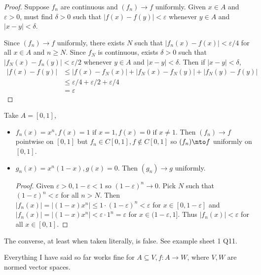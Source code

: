 \documentclass[a4paper]{article}
\theoremstyle{definition}
\begin{document}
\begin{proof}
  Suppose \(f_n\) are continuous and \((f_n)\to f\) uniformly. Given \(x\in A\) and \(\varepsilon>0\), must find \(\delta>0\) such that \(|f(x)-f(y)| < \varepsilon\) whenever \(y\in A\) and \(|x-y|<\delta\).

  Since \((f_n)\to f\) uniformly, there exists \(N\) such that \(|f_n(x)-f(x)|< \varepsilon/4\) for all \(x\in A\) and \(n\geq N\). Since \(f_N\) is continuous, exists \(\delta>0\) such that \(|f_N(x)-f_n(y)|<\varepsilon/2\) whenever \(y\in A\) and \(|x-y|<\delta\). Then if \(|x-y| < \delta\),
  \begin{align*}
    |f(x)-f(y)| &\leq |f(x)-f_N(x)| + |f_N(x)-f_N(y)| + |f_N(y)-f(y)| \\
                &\leq \varepsilon/4 + \varepsilon/2 + \varepsilon/4 \\
                &= \varepsilon
  \end{align*}
\end{proof}

\begin{eg}
  Take \(A=[0,1]\),
  \begin{itemize}
  \item \(f_n(x)=x^n, f(x) = 1\text{ if } x=1, f(x)=0 \text{ if } x\neq 1\). Then \((f_n)\to f\) pointwise on \([0,1]\) but \(f_n\in C[0,1], f\notin C[0,1]\) so \((f_n)\nto f\) uniformly on \([0,1]\).
  \item \(g_n(x) = x^n(1-x), g(x) =0\). Then \((g_n)\to g\) uniformly.
\begin{proof}
  Given \(\varepsilon>0, 1-\varepsilon<1\) so \((1-\varepsilon)^n\to 0\). Pick \(N\) such that \((1-\varepsilon)^n < \varepsilon\) for all \(n> N\). Then \(|f_n(x)| = |(1-x)x^n| \leq 1\cdot(1-\varepsilon)^n < \varepsilon\) for \(x\in[0,1-\varepsilon]\) and \(|f_n(x)| = |(1-x)x^n| < \varepsilon\cdot1^n=\varepsilon\) for \(x\in (1-\varepsilon,1]\). Thus \(|f_n(x)| < \varepsilon\) for all \(x\in[0,1]\).
\end{proof}
  \end{itemize}
\end{eg}

\begin{note}
  The converse, at least when taken literally, is false. See example sheet 1 Q11.
\end{note}

\begin{remark}
  Everything I have said so far works fine for \(A\subseteq V, f: A\to W\), where \(V, W\) are normed vector spaces.
\end{remark}
\end{document}
